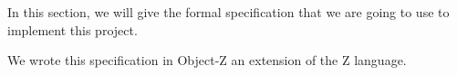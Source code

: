 In this section, we will give the formal specification that we are going to use to implement this project.

We wrote this specification in Object-Z an extension of the Z language.
